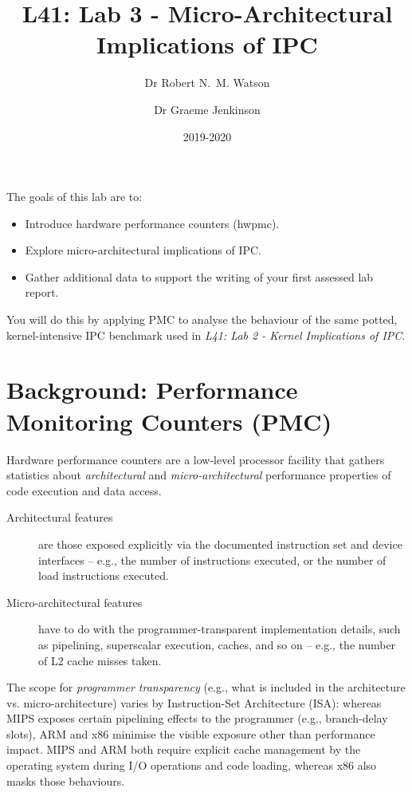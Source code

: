 \documentclass[a4paper,10pt]{article}
\begin{document}
\title{L41: Lab 3 - Micro-Architectural Implications of IPC}
\author{Dr Robert N.~M. Watson \and Dr Graeme Jenkinson}
\date{2019-2020}
\maketitle

\noindent
The goals of this lab are to:

\begin{itemize}
\item Introduce hardware performance counters (hwpmc).
\item Explore micro-architectural implications of IPC.
\item Gather additional data to support the writing of your first assessed lab
  report.
\end{itemize}

\noindent
You will do this by applying PMC to analyse the behaviour of the same potted,
kernel-intensive IPC benchmark used in \textit{L41: Lab 2 - Kernel
Implications of IPC}.

\section*{Background: Performance Monitoring Counters (PMC)}

Hardware performance counters are a low-level processor facility that gathers
statistics about \textit{architectural} and \textit{micro-architectural}
performance properties of code execution and data access.

\begin{description}
\item[Architectural features] are those exposed explicitly via the documented
instruction set and device interfaces -- e.g., the number of instructions
executed, or the number of load instructions executed.

\item[Micro-architectural features] have to do with the programmer-transparent
implementation details, such as pipelining, superscalar execution, caches, and
so on -- e.g., the number of L2 cache misses taken.
\end{description}

The scope for \textit{programmer transparency} (e.g., what is included in the
architecture vs. micro-architecture) varies by Instruction-Set Architecture
(ISA): whereas MIPS exposes certain pipelining effects to the programmer
(e.g., branch-delay slots), ARM and x86 minimise the visible exposure other
than performance impact.
MIPS and ARM both require explicit cache management by the operating system
during I/O operations and code loading, whereas x86 also masks those
behaviours.
\end{document}
